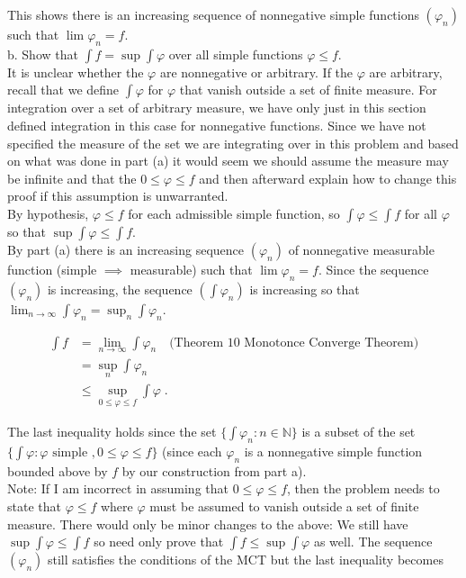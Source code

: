 \documentclass[a4paper]{article}
\begin{document}
This shows there is an increasing sequence of nonnegative simple functions $(\varphi_n)$ such that $\lim \varphi_n = f$. \\


b. Show that $\int f = \sup \int \varphi$ over all simple functions $\varphi \leq f$. \\

It is unclear whether the $\varphi$ are nonnegative or arbitrary. If the $\varphi$ are arbitrary, recall that we define $\int \varphi$ for $\varphi$ that vanish outside a set of finite measure. For integration over a set of arbitrary measure, we have only just in this section defined integration in this case for nonnegative functions. Since we have not specified the measure of the set we are integrating over in this problem and based on what was done in part (a) it would seem we should assume the measure may be infinite and that the $0 \leq \varphi \leq f$ and then afterward explain how to change this proof if this assumption is unwarranted.\\

By hypothesis, $\varphi \leq f$ for each admissible simple function, so $\int \varphi \leq \int f$ for all $\varphi$ so that $\sup \int \varphi \leq \int f$. \\

By part (a) there is an increasing sequence $(\varphi_n)$ of nonnegative measurable function (simple $\implies$ measurable) such that $\lim \varphi_n = f$. Since the sequence $(\varphi_n)$ is increasing, the sequence $(\int \varphi_n)$ is increasing so that $\lim_{n\rightarrow \infty} \int \varphi_n = \sup_{n} \int \varphi_n$. 

\begin{align*}
\int f & = \lim_{n\rightarrow \infty} \int \varphi_n \quad \text{(Theorem 10 Monotonce Converge Theorem)} \\
&= \sup_{n} \int \varphi_n \\
&\leq \sup_{0\leq \varphi \leq f} \int \varphi \;.
\end{align*}

The last inequality holds since the set $\{\int \varphi_n : n \in \mathbb{N}\}$ is a subset of the set $\{ \int \varphi : \varphi \text{ simple }, 0\leq \varphi \leq f \}$ (since each $\varphi_n$ is a nonnegative simple function bounded above by $f$ by our construction from part a). \\

Note: If I am incorrect in assuming that $0\leq \varphi \leq f$, then the problem needs to state that $\varphi \leq f$ where $\varphi$ must be assumed to vanish outside a set of finite measure. There would only be minor changes to the above: We still have $\sup \int \varphi \leq \int f$ so need only prove that $\int f \leq \sup \int \varphi$ as well. The sequence $(\varphi_n)$ still satisfies the conditions of the MCT but the last inequality becomes 
\end{document}
